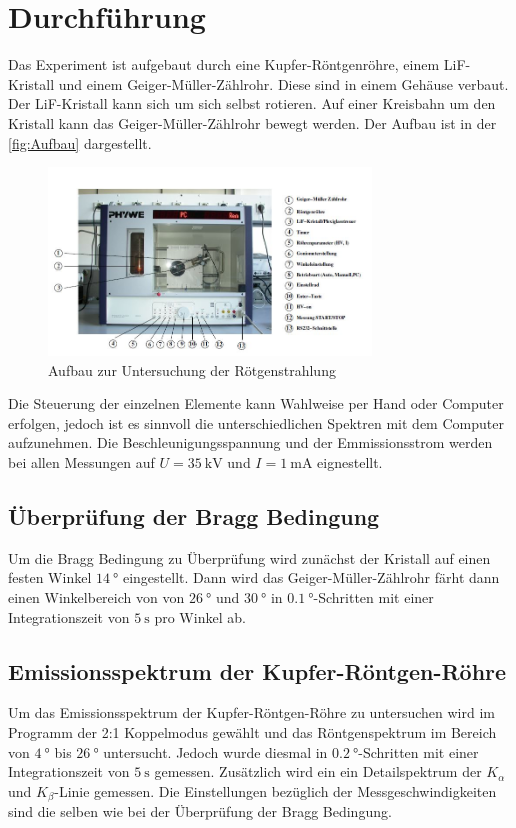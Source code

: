 \newpage
\section{Durchführung}
Das Experiment ist aufgebaut durch eine Kupfer-Röntgenröhre, einem LiF-Kristall und einem Geiger-Müller-Zählrohr. Diese sind in einem Gehäuse verbaut. Der LiF-Kristall kann sich um sich 
selbst rotieren. Auf einer Kreisbahn um den Kristall kann das Geiger-Müller-Zählrohr bewegt werden. Der Aufbau ist in der \autoref{fig:Aufbau} dargestellt.

\begin{figure}
    \centering
    \includegraphics[height=5cm]{content/mess.JPG}
    \caption{Aufbau zur Untersuchung der Rötgenstrahlung}
    \label{fig:Aufbau}
\end{figure}

\noindent
Die Steuerung der einzelnen Elemente kann Wahlweise per Hand oder Computer erfolgen, jedoch ist es sinnvoll die unterschiedlichen Spektren mit dem Computer aufzunehmen. Die Beschleunigungsspannung
und der Emmissionsstrom werden bei allen Messungen auf $U = \SI{35}{\kilo\volt}$ und $I = \SI{1}{\milli\ampere}$ eignestellt.

\subsection{Überprüfung der Bragg Bedingung}
Um die Bragg Bedingung zu Überprüfung wird zunächst der Kristall auf einen festen Winkel $\SI{14}{\degree}$ eingestellt. Dann wird das Geiger-Müller-Zählrohr färht dann einen Winkelbereich
von von $\SI{26}{\degree}$ und $\SI{30}{\degree}$ in $\SI{0.1}{\degree}$-Schritten mit einer Integrationszeit von $\SI{5}{\second}$ pro Winkel ab.

\subsection{Emissionsspektrum der Kupfer-Röntgen-Röhre}
Um das Emissionsspektrum der Kupfer-Röntgen-Röhre zu untersuchen wird im Programm der 2:1 Koppelmodus gewählt und das Röntgenspektrum im Bereich von $\SI{4}{\degree}$ bis $\SI{26}{\degree}$
untersucht. Jedoch wurde diesmal in $\SI{0.2}{\degree}$-Schritten mit einer Integrationszeit von $\SI{5}{\second}$ gemessen.
Zusätzlich wird ein ein Detailspektrum der $K_\alpha$ und $K_\beta$-Linie gemessen. Die Einstellungen bezüglich der Messgeschwindigkeiten sind die selben wie bei der Überprüfung der Bragg Bedingung.

